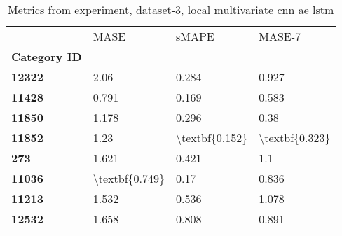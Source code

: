 \begin{table}[h]
\centering
\caption{Metrics from experiment, dataset-3, local multivariate cnn ae lstm}
\label{table:local-multivariate-cnn-ae-lstm-dataset-3}
\begin{tabular}{llll}
\toprule
{} &            MASE &           sMAPE &          MASE-7 \\
\textbf{Category ID} &                 &                 &                 \\
\midrule
\textbf{12322      } &            2.06 &           0.284 &           0.927 \\
\textbf{11428      } &           0.791 &           0.169 &           0.583 \\
\textbf{11850      } &           1.178 &           0.296 &            0.38 \\
\textbf{11852      } &            1.23 &  \textbackslash textbf\{0.152\} &  \textbackslash textbf\{0.323\} \\
\textbf{273        } &           1.621 &           0.421 &             1.1 \\
\textbf{11036      } &  \textbackslash textbf\{0.749\} &            0.17 &           0.836 \\
\textbf{11213      } &           1.532 &           0.536 &           1.078 \\
\textbf{12532      } &           1.658 &           0.808 &           0.891 \\
\bottomrule
\end{tabular}
\end{table}
